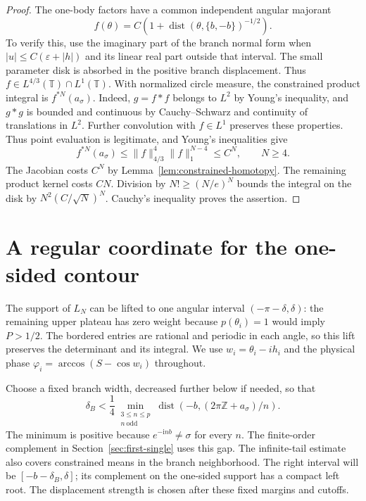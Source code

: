 \documentclass[11pt]{article}
\numberwithin{equation}{section}
\theoremstyle{remark}\newtheorem{remark}[theorem]{Remark}
\newcommand{\ii}{\mathrm i}
\begin{document}
\begin{proof}
The one-body factors have a common independent angular majorant
\[
 f(\theta)=C\left(1+
  \operatorname{dist}(\theta,\{b,-b\})^{-1/2}\right).
\]
To verify this, use the imaginary part of the branch normal form
when $|u|\le C(\varepsilon+|h|)$ and its linear real part outside
that interval.  The small parameter disk is absorbed in the positive
branch displacement.  Thus $f\in L^{4/3}(\mathbb T)\cap L^1(\mathbb T)$.
With normalized circle measure, the constrained product integral is
$f^{*N}(a_\sigma)$.  Indeed, $g=f*f$ belongs to $L^2$ by Young's
inequality, and $g*g$ is bounded and continuous by
Cauchy--Schwarz and continuity of translations in $L^2$.
Further convolution with $f\in L^1$ preserves these properties.
Thus point evaluation is legitimate, and Young's inequalities give
\[
 f^{*N}(a_\sigma)\le \|f\|_{4/3}^{4}\|f\|_1^{N-4}\le C^N,
 \qquad N\ge4.
\]
The Jacobian costs $C^N$ by Lemma~\ref{lem:constrained-homotopy}.
The remaining product kernel costs $CN$.  Division by
$N!\ge(N/e)^N$ bounds the integral on the disk by
$N^2(C/\sqrt N)^N$.  Cauchy's inequality proves the assertion.
\end{proof}

\section{A regular coordinate for the one-sided contour}\label{sec:global-coordinate}


The support of $L_N$ can be lifted to one angular interval
$(-\pi-\delta,\delta)$: the remaining upper plateau has zero
weight because $p(\theta_i)=1$ would imply $P>1/2$.
The bordered entries are rational and periodic in each angle,
so this lift preserves the determinant and its integral.
We use $w_i=\theta_i-ih_i$ and the physical phase
$\varphi_i=\arccos(S-\cos w_i)$ throughout.

Choose a fixed branch width, decreased further below if needed, so that
\begin{equation}\label{eq:finite-mean-exclusion}
 \delta_B<\frac14\min_{\substack{3\le n\le p\\n\ \mathrm{odd}}}
       \operatorname{dist}(-b,(2\pi\mathbb Z+a_\sigma)/n).
\end{equation}
The minimum is positive because $e^{-\ii nb}\ne\sigma$ for every $n$.
The finite-order complement in Section~\ref{sec:first-single} uses
this gap. The infinite-tail estimate also covers constrained means
in the branch neighborhood.
The right interval will be $[-b-\delta_B,\delta]$; its
complement on the one-sided support has a compact left root.
The displacement strength is chosen after these fixed margins and
cutoffs.
\end{document}

